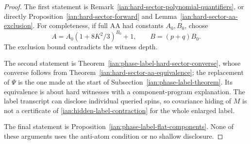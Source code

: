 \begin{proof}
The first statement is
Remark~\ref{ian:hard-sector-polynomial-quantifiers}, or directly
Proposition~\ref{ian:hard-sector-forward} and
Lemma~\ref{ian:hard-sector-aa-exclusion}. For completeness, if full AA had constants \(A_0,B_0\), choose
\[
 A=A_0(1+8K^2/3)^{B_0}+1,\qquad
 B=(p+q)B_0.
\]
The exclusion bound contradicts the witness depth.

The second statement is
Theorem~\ref{ian:phase-label-hard-sector-converse}, whose converse follows from
Theorem~\ref{ian:hard-sector-aa-equivalence}; the replacement of \(\Psi\) is the one made at the start of Subsection~\ref{ian:phase-label-theorem}. Its equivalence is about hard witnesses with a component-program explanation. The label transcript can disclose individual queried spins, so covariance hiding of \(M\) is not a certificate of
\eqref{ian:hidden-label-contraction} for the whole enlarged label.

The final statement is
Proposition~\ref{ian:phase-label-flat-components}. None of these arguments uses the anti-atom condition or no shallow disclosure.
\end{proof}

